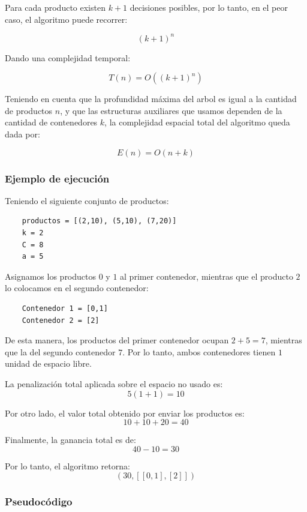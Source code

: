 \documentclass[12pt]{article}
\begin{document}
            Para cada producto existen \(k+1\) decisiones posibles, por lo tanto, en el peor caso, el algoritmo puede recorrer:

            \[
            (k+1)^n
            \]

            Dando una complejidad temporal:

            \[
            T(n)=O((k+1)^n)
            \]


            Teniendo en cuenta que la profundidad máxima del arbol es igual a la cantidad de productos \(n\), y que las estructuras auxiliares que usamos dependen de la cantidad de contenedores \(k\), la complejidad espacial total del algoritmo queda dada por:

            \[
            E(n)=O(n+k)
            \]

        \subsubsection{Ejemplo de ejecución}
            Teniendo el siguiente conjunto de productos:

\begin{verbatim}
    productos = [(2,10), (5,10), (7,20)]
    k = 2
    C = 8
    a = 5
\end{verbatim}

            Asignamos los productos \(0\) y \(1\) al primer contenedor, mientras que el producto \(2\) lo colocamos en el segundo contenedor:
\begin{verbatim}
    Contenedor 1 = [0,1]
    Contenedor 2 = [2]
\end{verbatim}

            De esta manera, los productos del primer contenedor ocupan \(2+5=7\), mientras que la del segundo contenedor \(7\). Por lo tanto, ambos contenedores tienen \(1\) unidad de espacio libre.

            La penalización total aplicada sobre el espacio no usado es:
            \[
            5(1+1)=10
            \]

            Por otro lado, el valor total obtenido por enviar los productos es:
            \[
            10+10+20=40
            \]

            Finalmente, la ganancia total es de:
            \[
            40-10=30
            \]

            Por lo tanto, el algoritmo retorna:
            \[
            (30, [[0,1], [2]])
            \]

        \subsubsection{Pseudocódigo}
\end{document}
